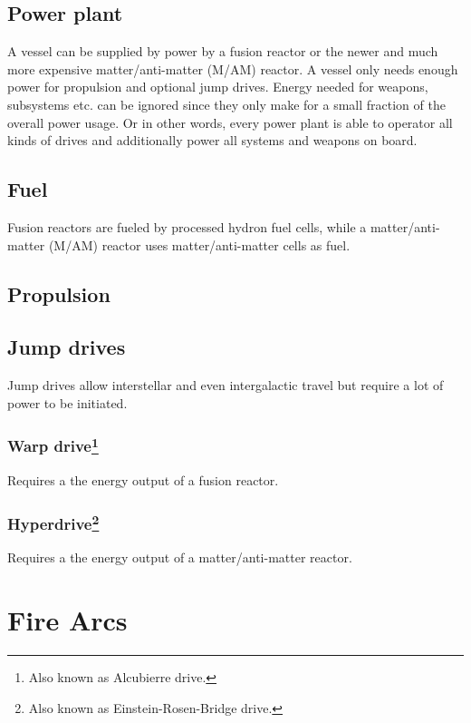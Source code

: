 \subsection{Power plant}

A vessel can be supplied by power by a fusion reactor or the newer and much more expensive matter/anti-matter (M/AM) reactor. A vessel only needs enough power for propulsion and optional jump drives. Energy needed for weapons, subsystems etc. can be ignored since they only make for a small fraction of the overall power usage. Or in other words, every power plant is able to operator all kinds of drives and additionally power all systems and weapons on board.

\subsection{Fuel}
\label{sub:Fuel}

Fusion reactors are fueled by processed hydron fuel cells, while  a matter/anti-matter (M/AM) reactor uses matter/anti-matter cells as fuel.

\subsection{Propulsion}


\subsection{Jump drives}

Jump drives allow interstellar and even intergalactic travel but require a lot of power to be initiated.

\subsubsection[Warp drive]{Warp drive\footnote{Also known as Alcubierre drive.}}

Requires a the energy output of a fusion reactor.

\subsubsection[Hyperdrive]{Hyperdrive\footnote{Also known as Einstein-Rosen-Bridge drive.}}

Requires a the energy output of a matter/anti-matter reactor.

\section{Fire Arcs}
\label{sec:Fire Arcs}

